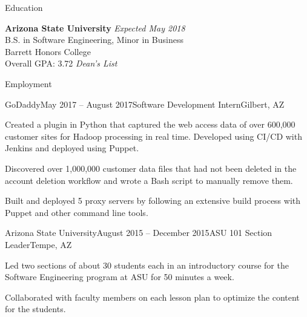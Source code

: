 \documentclass{resume} %
\begin{document}

\begin{rSection}{Education}

{\bf Arizona State University} \hfill {\em Expected May 2018} \\
B.S. in Software Engineering, Minor in Business \\
Barrett Honors College \smallskip \\
Overall GPA: 3.72 \textit{Dean's List}

\end{rSection}


\begin{rSection}{Employment}

\begin{rSubsection}{GoDaddy}{May 2017 -- August 2017}{Software Development Intern}{Gilbert, AZ}
\item Created a plugin in Python that captured the web access data of over 600,000 customer sites for Hadoop processing in real time. Developed using CI/CD with Jenkins and deployed using Puppet.
\item Discovered over 1,000,000 customer data files that had not been deleted in the account deletion workflow and wrote a Bash script to manually remove them.
\item Built and deployed 5 proxy servers by following an extensive build process with Puppet and other command line tools.
\end{rSubsection}

\begin{rSubsection}{Arizona State University}{August 2015 -- December 2015}{ASU 101 Section Leader}{Tempe, AZ}
\item Led two sections of about 30 students each in an introductory course for the Software Engineering program at ASU for 50 minutes a week.
\item Collaborated with faculty members on each lesson plan to optimize the content for the students.
\end{rSubsection}

\end{rSection}
\end{document}
